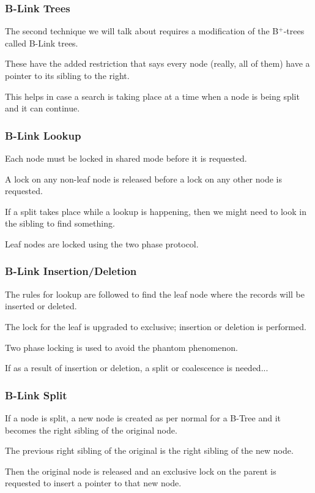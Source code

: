 \begin{frame}
\frametitle{B-Link Trees}
The second technique we will talk about requires a modification of the B$^{+}$-trees called \alert{B-Link} trees. 

These have the added restriction that says every node (really, all of them) have a pointer to its sibling to the right. 

This helps in case a search is taking place at a time when a node is being split and it can continue. 


\end{frame}

\begin{frame}
\frametitle{B-Link Lookup}

Each node must be locked in shared mode before it is requested. 

A lock on any non-leaf node is released before a lock on any other node is requested. 

If a split takes place while a lookup is happening, then we might need to look in the sibling to find something. 

Leaf nodes are locked using the two phase protocol.

\end{frame}

\begin{frame}
\frametitle{B-Link Insertion/Deletion}

The rules for lookup are followed to find the leaf node where the records will be inserted or deleted. 

The lock for the leaf is upgraded to exclusive; insertion or deletion is performed. 

Two phase locking is used to avoid the phantom phenomenon.

If as a result of insertion or deletion, a split or coalescence is needed...

\end{frame}

\begin{frame}
\frametitle{B-Link Split}

If a node is split, a new node is created as per normal for a B-Tree and it becomes the right sibling of the original node. 

The previous right sibling of the original is the right sibling of the new node. 

Then the original node is released and an exclusive lock on the parent is requested to insert a pointer to that new node.

\end{frame}

